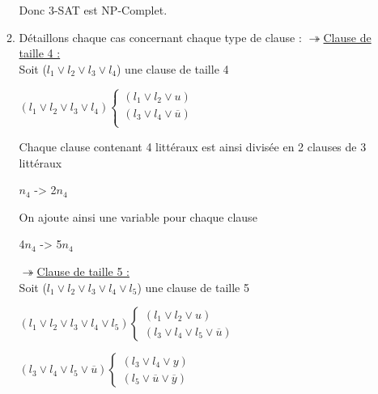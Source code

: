 \documentclass[]{article}
\begin{document}
\begin{enumerate}
\begin{enumerate}
    Donc 3-SAT est NP-Complet.\\

    \item
      Détaillons chaque cas concernant chaque type de clause :
     $\twoheadrightarrow$\underline{Clause de taille 4 :}\\
     Soit ($l_1 \vee l_2 \vee l_3 \vee l_4$) une clause de taille 4\\

      \begin{center}
        $(l_1 \vee l_2 \vee l_3 \vee l_4)\left\lbrace 
        \begin{array}{lcl} 
          (l_1 \vee l_2 \vee u)\\ 
          (l_3 \vee l_4 \vee \overline u)\\ 
        \end{array}\right.$ 
      \end{center}

      Chaque clause contenant 4 littéraux est ainsi divisée en 2 clauses de 3 littéraux
      \begin{center}
        $n_4$ -> 2$n_4$
      \end{center}
      On ajoute ainsi une variable pour chaque clause
      \begin{center}
        4$n_4$ -> 5$n_4$
      \end{center}
      \bigbreak

      $\twoheadrightarrow$\underline{Clause de taille 5 :}\\      
      Soit ($l_1 \vee l_2 \vee l_3 \vee l_4 \vee l_5$) une clause de taille 5

      \begin{center}
     $ (l_1 \vee l_2 \vee l_3 \vee l_4 \vee l_5)\left\lbrace
      \begin{array}{lcl}
        (l_1 \vee l_2 \vee u)\\
        (l_3 \vee l_4 \vee l_5 \vee \overline u)
      \end{array}\right.$
      \end{center}

      \begin{center}
        $(l_3 \vee l_4 \vee l_5 \vee \overline u)\left\lbrace
      \begin{array}{lcl} 
        (l_3 \vee l_4 \vee y)\\
        (l_5 \vee \overline u \vee \overline y)
      \end{array}\right.$
      \end{center}


\end{enumerate}
\end{enumerate}
\end{document}
